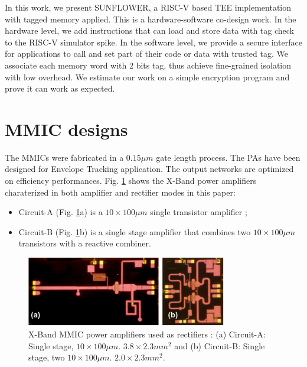 \documentclass[conference]{IEEEtran}
\begin{document}
In this work, we present SUNFLOWER, a RISC-V based TEE implementation with tagged memory applied. This is a hardware-software co-design work. In the hardware level, we add instructions that can load and store data with tag check to the RISC-V simulator spike. In the software level, we provide a secure interface for applications to call and set part of their code or data with trusted tag. We associate each memory word with 2 bits tag, thus achieve fine-grained isolation with low overhead. We estimate our work on a simple encryption program and prove it can work as expected. 



\section{MMIC designs}

The MMICs were fabricated in a $0.15\mu m$ gate length process. The PAs have been designed for Envelope Tracking application. The output networks are optimized on efficiency performances.
Fig. \ref{picture} shows the X-Band power amplifiers charaterized in both amplifier and rectifier modes in this paper:
\begin{itemize}
\item Circuit-A (Fig. \ref{picture}a) is a $10\times100\mu m$ single transistor amplifier ;
\item Circuit-B (Fig. \ref{picture}b) is a single stage amplifier that combines two $10\times100\mu m$ transistors with a reactive combiner.
\end{itemize}

\begin{figure}[ht!] %
\centering
\includegraphics[width=3.45in]{IMS2014_Pictures_PA.png}
\caption{ X-Band MMIC power amplifiers used as rectifiers : (a) Circuit-A: Single stage, $10\times100\mu m$. $3.8\times2.3mm^2$ and (b) Circuit-B: Single stage, two $10\times100\mu m$. $2.0\times2.3mm^2$.}
\label{picture}
\end{figure}


\end{document}
